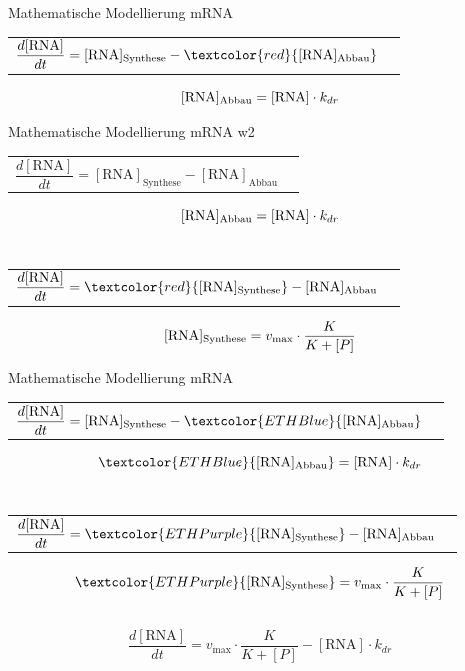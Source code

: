 \documentclass[11pt,aspectratio=169,reqno]{beamer}
\begin{document}
\begin{frame}[t]{Mathematische Modellierung mRNA}
    \begin{tabular}{l l}
        $\dfrac{d[\text{RNA}]}{dt} =[\text{RNA}]_{\text{Synthese}}-\textcolor{red}{[\text{RNA}]_{\text{Abbau}}}$ &  \\
    \end{tabular}
    \begin{equation}\notag
        [\text{RNA}]_{\text{Abbau}}=[\text{RNA}] \cdot k_{dr}
    \end{equation}
\end{frame}

\begin{frame}[t]{Mathematische Modellierung mRNA}
w2    \begin{tabular}{l l}
        $\dfrac{d[\text{RNA}]}{dt} =[\text{RNA}]_{\text{Synthese}}-{[\text{RNA}]_{\text{Abbau}}}$ &  \\
    \end{tabular}
    \begin{equation}\notag
        [\text{RNA}]_{\text{Abbau}}=[\text{RNA}] \cdot k_{dr}
    \end{equation}
    \\[16pt]
    \begin{tabular}{l l}
        $\dfrac{d[\text{RNA}]}{dt} =\textcolor{red}{[\text{RNA}]_{\text{Synthese}}}-{[\text{RNA}]_{\text{Abbau}}}$ &  \\
    \end{tabular}
    \begin{equation}\notag
        [\text{RNA}]_{\text{Synthese}}=v_{\text{max}}\cdot\frac{K}{K+[P]}
    \end{equation}
\end{frame}

\begin{frame}[t]{Mathematische Modellierung mRNA}
    \begin{tabular}{l l}
        $\dfrac{d[\text{RNA}]}{dt} =[\text{RNA}]_{\text{Synthese}}-\textcolor{ETHBlue}{[\text{RNA}]_{\text{Abbau}}}$ &  \\
    \end{tabular}
    \begin{equation}\notag
        \textcolor{ETHBlue}{
        [\text{RNA}]_{\text{Abbau}}}=[\text{RNA}] \cdot k_{dr}
    \end{equation}
    \\[16pt]
    \begin{tabular}{l l}
        $\dfrac{d[\text{RNA}]}{dt} =\textcolor{ETHPurple}{[\text{RNA}]_{\text{Synthese}}}-[\text{RNA}]_{\text{Abbau}}$ &  \\
    \end{tabular}
    \begin{equation}\notag
    \textcolor{ETHPurple}{[\text{RNA}]_{\text{Synthese}}}=v_{\text{max}}\cdot\frac{K}{K+[P]}
    \end{equation}
    \\[16pt]
    \begin{equation}\tag{1}
        \frac{d[\text{RNA}]}{dt}=v_{\text{max}}\cdot\frac{K}{K+[P]}-[\text{RNA}] \cdot k_{dr}
    \end{equation}
\end{frame}
\end{document}
